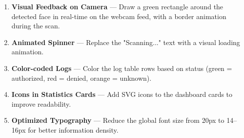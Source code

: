 \begin{enumerate}
    \item \textbf{Visual Feedback on Camera} — Draw a green rectangle around the detected face in real-time on the webcam feed, with a border animation during the scan.
    \item \textbf{Animated Spinner} — Replace the "Scanning..." text with a visual loading animation.
    \item \textbf{Color-coded Logs} — Color the log table rows based on status (green = authorized, red = denied, orange = unknown).
    \item \textbf{Icons in Statistics Cards} — Add SVG icons to the dashboard cards to improve readability.
    \item \textbf{Optimized Typography} — Reduce the global font size from 20px to 14--16px for better information density.
\end{enumerate}
